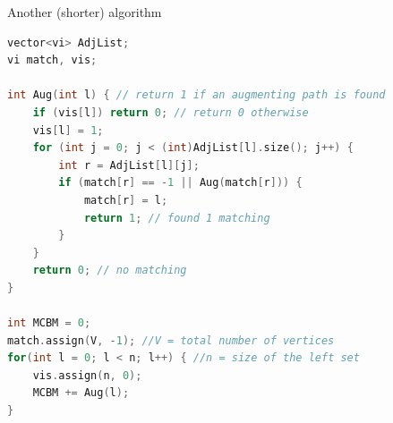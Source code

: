 \documentclass[12pt]{beamer}
\begin{document}
\begin{frame}[fragile]{Another (shorter) algorithm}
    \begin{lstlisting}[language=C++]
vector<vi> AdjList;
vi match, vis;

int Aug(int l) { // return 1 if an augmenting path is found
    if (vis[l]) return 0; // return 0 otherwise
    vis[l] = 1;
    for (int j = 0; j < (int)AdjList[l].size(); j++) {
        int r = AdjList[l][j];
        if (match[r] == -1 || Aug(match[r])) {
            match[r] = l; 
            return 1; // found 1 matching
        }
    }
    return 0; // no matching
}

int MCBM = 0;
match.assign(V, -1); //V = total number of vertices
for(int l = 0; l < n; l++) { //n = size of the left set
    vis.assign(n, 0);
    MCBM += Aug(l);
}\end{lstlisting}
\end{frame}
\end{document}
